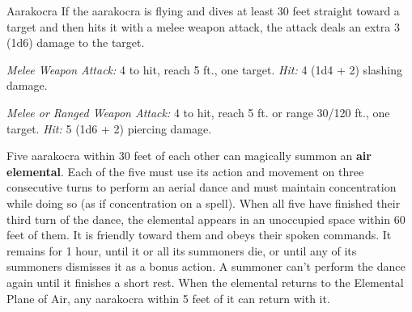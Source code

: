 \documentclass[10pt,a4paper,twoside,bg=print,twocolumn,openany,nodeprecatedcode]{dndbook}
\begin{document}
\begin{DndMonster}[float=t]{Aarakocra}
\DndMonsterBasics[
armor-class = {12},
hit-points = {\DndDice{3d8}},
speed = {20 ft., fly 50 ft.}
]
\DndMonsterAbilityScores[
 str = 10,
 dex = 14,
 con = 10,
 int = 11,
 wis = 12,
 cha = 11
]
\DndMonsterDetails[
skills = {Perception +5},
languages = {Auran, Aarakocra},
challenge = 1/4,
]
If the aarakocra is flying and dives at least 30 feet straight toward a target and then hits it with a melee weapon attack, the attack deals an extra 3 (1d6) damage to the target.

\textsl{Melee Weapon Attack:} 4 to hit, reach 5 ft., one target. \textsl{Hit:} 4 (1d4 + 2) slashing damage.

\textsl{Melee or Ranged Weapon Attack:} 4 to hit, reach 5 ft. or range 30/120 ft., one target. \textsl{Hit:} 5 (1d6 + 2) piercing damage.

Five aarakocra within 30 feet of each other can magically summon an \textbf{air elemental}. Each of the five must use its action and movement on three consecutive turns to perform an aerial dance and must maintain concentration while doing so (as if concentration on a spell). When all five have finished their third turn of the dance, the elemental appears in an unoccupied space within 60 feet of them. It is friendly toward them and obeys their spoken commands. It remains for 1 hour, until it or all its summoners die, or until any of its summoners dismisses it as a bonus action. A summoner can't perform the dance again until it finishes a short rest. When the elemental returns to the Elemental Plane of Air, any aarakocra within 5 feet of it can return with it.

\end{DndMonster}
\end{document}

